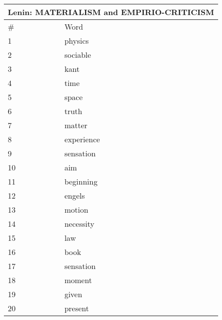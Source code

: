 
    \begin{center}
      \begin{tabular}{ | l | l | }
        \hline
        \multicolumn{2}{|c|}{Lenin: MATERIALISM and EMPIRIO-CRITICISM} \\ \hline
        \# & Word  \\ \hline
1 & physics \\ \hline 
2 & sociable \\ \hline 
3 & kant \\ \hline 
4 & time \\ \hline 
5 & space \\ \hline 
6 & truth \\ \hline 
7 & matter \\ \hline 
8 & experience \\ \hline 
9 & sensation \\ \hline 
10 & aim \\ \hline 
11 & beginning \\ \hline 
12 & engels \\ \hline 
13 & motion \\ \hline 
14 & necessity \\ \hline 
15 & law \\ \hline 
16 & book \\ \hline 
17 & sensation \\ \hline 
18 & moment \\ \hline 
19 & given \\ \hline 
20 & present \\ \hline 

      \end{tabular}
    \end{center}
            